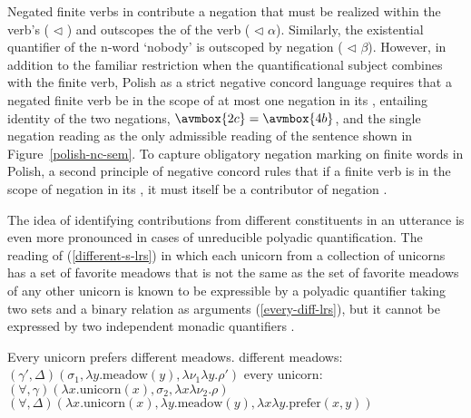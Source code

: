 \documentclass[output=paper]{langsci/langscibook}
\begin{document}
Negated finite verbs in  contribute a negation that must be realized
within the verb's  ( $\triangleleft$ ) and
outscopes the  of the verb ( $\triangleleft$ $\alpha$).
Similarly, the existential quantifier of the n-word  `nobody' is
outscoped by negation ( $\triangleleft$ $\beta$). However, in addition
to the familiar restriction when the quantificational subject combines
with the finite verb, Polish as a strict negative concord language requires
that a negated finite verb be in the scope of at most one negation in
its , entailing identity of the two negations,
$\avmbox{2c}=\avmbox{4b}$, and the single negation reading  as
the only admissible reading of the sentence shown in Figure~\ref{polish-nc-sem}.
To capture obligatory negation marking on finite words in Polish, a second
principle of negative concord rules that if a finite verb is in the scope
of negation in its , it must itself be a contributor of negation \citep[316]{RichterandSailer2001}.

The idea of identifying contributions from different constituents in
an utterance is even more pronounced in cases of unreducible polyadic
quantification. The reading of (\ref{different-s-lrs}) in which each
unicorn from a collection of unicorns has a set of favorite meadows that
is not the same as the set of favorite meadows of any other unicorn is known
to be expressible by a polyadic quantifier taking two sets and a binary
relation as arguments (\ref{every-diff-lrs}), but it cannot be expressed by
two independent monadic quantifiers \citep{Keenan1992b}.


\begin{exe}
\ex\label{different-lrs}
\begin{xlist}
\ex\label{different-s-lrs} Every unicorn prefers different meadows.
\ex \label{different-meadows-lrs}
different meadows: \hspace{0.18cm} $(\gamma', \Delta)(\sigma_1, \lambda y.\text{meadow}(y), \lambda \nu_1\lambda y.\rho')$
\ex \label{every-unicorn-lrs}
every unicorn: \hspace{0.95cm}$(\forall, \gamma)(\lambda x.\text{unicorn}(x), \sigma_2, \lambda x\lambda \nu_2.\rho)$
\ex \label{every-diff-lrs}
$(\forall, \Delta)(\lambda x.\text{unicorn}(x), \lambda y.\text{meadow}(y), \lambda x\lambda y.\text{prefer}(x,y))$
\end{xlist}
\end{exe}
\end{document}
